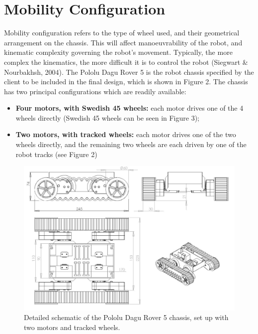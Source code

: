 \documentclass[a4paper]{article}
\begin{document}
\section{Mobility Configuration}

Mobility configuration refers to the type of wheel used, and their geometrical arrangement on the chassis. This will affect manoeuvrability of the robot, and kinematic complexity governing the robot's movement. Typically, the more complex the kinematics, the more difficult it is to control the robot (Siegwart \& Nourbakhsh, 2004). The Pololu Dagu Rover 5 is the robot chassis specified by the client to be included in the final design, which is shown in Figure 2. The chassis has two principal configurations which are readily available:
\begin{itemize}
\item \textbf{Four motors, with Swedish 45 wheels:} each motor drives one of the 4 wheels directly (Swedish 45 wheels can be seen in Figure 3);
\item \textbf{Two motors, with tracked wheels:} each motor drives one of the two wheels directly, and the remaining two wheels are each driven by one of the robot tracks (see Figure 2)
\end{itemize}

\begin{figure}[h]
\centering
\includegraphics[scale=0.3]{fig1}
\caption{Detailed schematic of the Pololu Dagu Rover 5 chassis, set up with two motors and tracked wheels.}
\end{figure}
\end{document}
